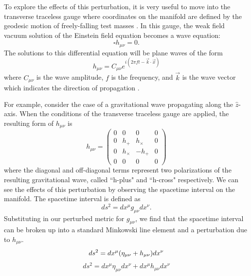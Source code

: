 To explore the effects of this perturbation, it is very useful to move 
into the transverse traceless 
gauge where coordinates on the manifold are defined by the geodesic 
motion of freely-falling test masses \cite{Saulson:1994}. In this gauge, the weak field 
vacuum solution of the Einstein field equation becomes a wave equation: 
\begin{equation}
\square h_{\mu\nu} = 0.
\end{equation}
The solutions to this differential equation will be plane waves of 
the form
\begin{equation}
h_{\mu\nu} = C_{\mu\nu}e^{i(2\pi ft - \vec{k}\cdot\vec{x})}
\end{equation}
where $C_{\mu\nu}$ is the wave amplitude, $f$ is the frequency, 
and $\vec{k}$ is the wave vector which indicates the direction of 
propagation \cite{Carroll}.

For example, consider the case of a gravitational 
wave propagating along the $\hat{z}$-axis.
When the conditions of the transverse traceless gauge are applied, 
the resulting form of $h_{\mu\nu}$ is 
\begin{equation}
h_{\mu\nu} = 
  \begin{pmatrix}
    0 & 0 & 0 & 0 \\
    0 & h_+ & h_\times & 0 \\
    0 & h_\times & -h_+ & 0 \\
    0 & 0 & 0 & 0
  \end{pmatrix}
\label{eq:strain}
\end{equation}
where the diagonal and off-diagonal terms represent two polarizations 
of the resulting gravitational wave, called ``h-plus" and ``h-cross" 
respectively.
We can see the effects of this perturbation by observing the  
spacetime interval on the manifold. The spacetime interval is defined as 
\begin{equation}
ds^2 = dx^\mu g_{\mu\nu}dx^\nu.
\end{equation}
Substituting in our perturbed metric for $g_{\mu\nu}$, we find that 
the spacetime interval can be broken up into a standard Minkowski line 
element and a perturbation due to $h_{\mu\nu}$.
\begin{equation}
ds^2 = dx^\mu (\eta_{\mu\nu} + h_{\mu\nu})dx^\nu \\
\end{equation}
\begin{equation}
ds^2 = dx^\mu \eta_{\mu\nu} dx^\nu + dx^\mu h_{\mu\nu}dx^\nu
\label{eq:spacetime}
\end{equation}

